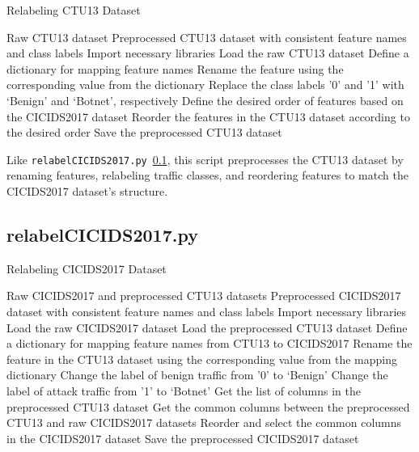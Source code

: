 \begin{algorithm}[H]
    \caption{Relabeling CTU13 Dataset}\label{alg:relabelCTU13}
    \begin{algorithmic}[1]
    \Require Raw CTU13 dataset
    \Ensure Preprocessed CTU13 dataset with consistent feature names and class labels
    \State Import necessary libraries
    \State Load the raw CTU13 dataset
    \State Define a dictionary for mapping feature names
    \State Rename the feature using the corresponding value from the dictionary
    \EndIf
    \EndFor
    \State Replace the class labels '0' and '1' with `Benign' and `Botnet', respectively
    \State Define the desired order of features based on the CICIDS2017 dataset
    \State Reorder the features in the CTU13 dataset according to the desired order
    \State Save the preprocessed CTU13 dataset
    \end{algorithmic}
\end{algorithm}

Like \texttt{relabelCICIDS2017.py}~\ref{subsec:relabelCICIDS2017.py}, this script preprocesses the CTU13 dataset by renaming features, relabeling traffic classes, and reordering features to match the CICIDS2017 dataset's structure.

\subsection{relabelCICIDS2017.py}\label{subsec:relabelCICIDS2017.py}

\begin{algorithm}[H]
    \caption{Relabeling CICIDS2017 Dataset}\label{alg:relabelCICIDS2017}
    \begin{algorithmic}[1]
    \Require Raw CICIDS2017 and preprocessed CTU13 datasets
    \Ensure Preprocessed CICIDS2017 dataset with consistent feature names and class labels
    \State Import necessary libraries
    \State Load the raw CICIDS2017 dataset
    \State Load the preprocessed CTU13 dataset
    \State Define a dictionary for mapping feature names from CTU13 to CICIDS2017
    \State Rename the feature in the CTU13 dataset using the corresponding value from the mapping dictionary
    \EndIf
    \EndFor
    \State Change the label of benign traffic from '0' to `Benign'
    \State Change the label of attack traffic from '1' to `Botnet'
    \State Get the list of columns in the preprocessed CTU13 dataset
    \State Get the common columns between the preprocessed CTU13 and raw CICIDS2017 datasets
    \State Reorder and select the common columns in the CICIDS2017 dataset
    \State Save the preprocessed CICIDS2017 dataset
    \end{algorithmic}
\end{algorithm}

